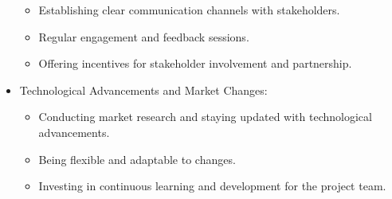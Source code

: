 \documentclass{article}
\begin{document}
\begin{itemize}[label={--}]
    \begin{itemize}
        \item Establishing clear communication channels with stakeholders.
        \item Regular engagement and feedback sessions.
        \item Offering incentives for stakeholder involvement and partnership.
    \end{itemize}
    \item Technological Advancements and Market Changes:
    \begin{itemize}
        \item Conducting market research and staying updated with technological advancements.
        \item Being flexible and adaptable to changes.
        \item Investing in continuous learning and development for the project team.
    \end{itemize}
\end{itemize}
\end{document}
